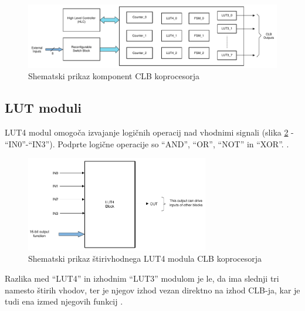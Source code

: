 \documentclass[a4paper]{article}
\begin{document}
\begin{sloppypar}
\begin{figure}[t]
    \begin{center}
        \begin{minipage}[t]{12cm}
            \includegraphics[width=12cm]{clb_moduli}
            \caption{Shematski prikaz komponent CLB koprocesorja
                     \cite[Pogl.~26.2]{mcu-ref-manual}}
            \label{fig:clb_moduli}
        \end{minipage}
    \end{center}
\end{figure}

\subsection{LUT moduli}\label{sec:lut}
LUT4 modul omogoča izvajanje logičnih operacij nad vhodnimi signali 
(slika \ref{fig:lut4} - ``IN0''-``IN3''). Podprte logične operacije so ``AND'', ``OR'',
``NOT'' in ``XOR''.
\cite[Pogl.~3.3]{clb-user-guide}.

\begin{figure}[htb]
    \centerline{\includegraphics[width=8cm]{shema_lut}}
    \caption{Shematski prikaz štirivhodnega LUT4 modula CLB koprocesorja
             \cite[Pogl.~26.4.4]{mcu-ref-manual}}
    \label{fig:lut4} 
\end{figure} 

Razlika med ``LUT4'' in izhodnim ``LUT3'' modulom je le, da ima slednji tri
namesto štirih vhodov, ter je njegov izhod vezan direktno na izhod CLB-ja, kar
je tudi ena izmed njegovih funkcij \cite[Pogl.~26.4.4-26.4.5]{mcu-ref-manual}.


\end{sloppypar}
\end{document}
